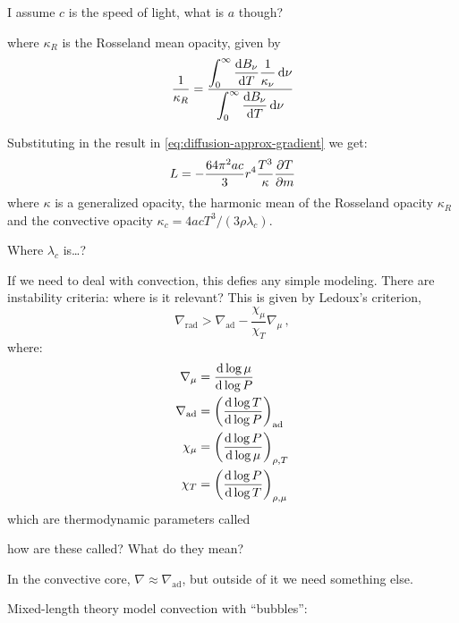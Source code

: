 \documentclass[main.tex]{subfiles}
\begin{document}
\begin{greenbox}
  I assume \(c\) is the speed of light, what is \(a\) though?
\end{greenbox}

%
where \(\kappa_R\) is the Rosseland mean opacity, given by
%
\begin{equation}
  \frac{1}{\kappa_{R}} =
  \frac{ \displaystyle\int _{0}   ^{\infty}  \dv{B_\nu}{T} \frac{1}{\kappa_\nu} \dd{\nu}}
  {  \displaystyle \int _{0}   ^{\infty} \dv{B_\nu}{T} \dd{\nu}}
\end{equation}

Substituting in the result in \eqref{eq:diffusion-approx-gradient} we get:
%
\begin{equation}
    L = - \frac{64 \pi^2 a c }{3} r^4 \frac{T^3}{\kappa} \pdv{T}{m}
\end{equation}
%
where \(\kappa\) is a generalized opacity, the harmonic mean of the Rosseland opacity \(\kappa _R \) and the convective opacity \(\kappa_c = 4acT^3 / (3 \rho \lambda_c )\).

\begin{greenbox}
  Where \(\lambda_c\) is\dots  ?
\end{greenbox}

If we need to deal with convection, this defies any simple modeling. There are instability criteria: where is it relevant? This is given by
Ledoux's criterion,
%
\begin{equation}
    \nabla_{\text{rad}} > \nabla_{\text{ad}} - \frac{\chi_\mu}{\chi_T} \nabla_\mu\,,
\end{equation}
%
where:
%
\begin{subequations}
\begin{align}
  \nabla_\mu  &= \dv{\log \mu }{\log P} \\
  \nabla_{\text{ad}}  &= \qty(\dv{\log T }{\log P} )_{\text{ad}} \\
  \chi_{\mu}  &= \qty(\dv{\log P }{\log \mu} )_{\rho, T} \\
  \chi_{T}  &= \qty(\dv{\log P }{\log T} )_{\rho, \mu} 
\end{align}
\end{subequations}
%
which are thermodynamic parameters called

\begin{greenbox}
  how are these called? What do they mean?
\end{greenbox}

In the convective core, \(\nabla \approx \nabla_{\text{ad}}\), but outside of it we need something else.

Mixed-length theory model convection with ``bubbles'':
\end{document}
